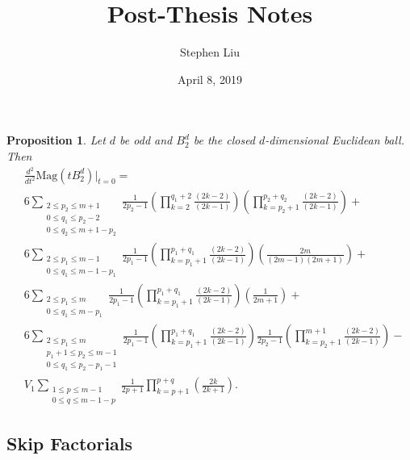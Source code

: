 \documentclass[11pt]{article}
\theoremstyle{definition}
\theoremstyle{definition}
\theoremstyle{plain}
\theoremstyle{plain}
\newtheorem{prop}{Proposition}
\theoremstyle{plain}
\theoremstyle{definition}
\theoremstyle{definition}
\begin{document}
\author{Stephen Liu}
\title{Post-Thesis Notes}
\date{April 8, 2019}

\maketitle

\begin{prop}\label{prop:partialres}
Let $d$ be odd and $B_2^d$ be the closed $d$-dimensional Euclidean ball. Then
\begin{equation}\label{eqn:partialres}
\begin{aligned}
&\frac{d^2}{dt^2}\text{Mag}(tB_2^d)\big\vert_{t=0} = \\
&6\sum\limits_{\substack{2\leq p_2\leq m+1 \\ 0\leq q_1 \leq p_2-2 \\ 0\leq q_2 \leq m+1-p_2}}\frac{1}{2p_2-1}\left(\prod\limits_{k=2}^{q_1+2}\frac{(2k-2)}{(2k-1)}\right)\left(\prod\limits_{k=p_2+1}^{p_2+q_2}\frac{(2k-2)}{(2k-1)}\right) + \\
&6\sum\limits_{\substack{2\leq p_1\leq m-1 \\ 0\leq q_1\leq m-1-p_1}}\frac{1}{2p_1-1}\left(\prod\limits_{k=p_1+1}^{p_1+q_1}\frac{(2k-2)}{(2k-1)}\right)\left(\frac{2m}{(2m-1)(2m+1)}\right) + \\
&6\sum\limits_{\substack{2\leq p_1\leq m \\ 0\leq q_1\leq m-p_1}}\frac{1}{2p_1-1}\left(\prod\limits_{k=p_1+1}^{p_1+q_1}\frac{(2k-2)}{(2k-1)}\right)\left(\frac{1}{2m+1}\right) + \\
&6\sum\limits_{\substack{2\leq p_1\leq m \\ p_1+1\leq p_2 \leq m-1 \\ 0\leq q_1\leq p_2-p_1-1 }}\frac{1}{2p_1-1}\left(\prod\limits_{k=p_1+1}^{p_1+q_1}\frac{(2k-2)}{(2k-1)}\right)\frac{1}{2p_2-1}\left(\prod\limits_{k=p_2+1}^{m+1}\frac{(2k-2)}{(2k-1)}\right) - \\
&V_{1}\sum\limits_{\substack{1\leq p \leq m-1 \\ 0 \leq q \leq m - 1 - p}}\frac{1}{2p+1}\prod\limits_{k=p+1}^{p+q}\left(\frac{2k}{2k+1}\right).
\end{aligned}
\end{equation}
\end{prop}

\subsection*{Skip Factorials}
\end{document}
